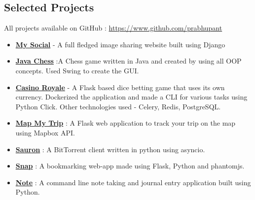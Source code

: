 \documentclass[margin, centered] {res}
\begin{document}
\begin{resume}
\section{Selected Projects}
All projects available on GitHub : \url{https://www.github.com/prabhupant}
\begin{itemize}[leftmargin=*]
 \item \textbf{\href{https://github.com/prabhupant/my-social}{My Social}} - A full fledged image sharing website built using Django
 \item \textbf{\href{https://github.com/prabhupant/OOP-Chess}{Java Chess}} :A Chess game written in Java and created by using all OOP concepts. Used Swing to create the GUI.
 \item \textbf{\href{https://github.com/prabhupant/casino-royale}{Casino Royale}} - A Flask based dice betting game that uses its own currency. Dockerized the application and made a CLI for various tasks using Python Click. Other technologies used - Celery, Redis, PostgreSQL.
 \item \textbf{\href{https://github.com/prabhupant/map-my-trip}{Map My Trip}} : A Flask web application to track your trip on the map using Mapbox API.
 \item \textbf{\href{https://github.com/prabhupant/sauronl}{Sauron}} : A BitTorrent client written in python using asyncio.
  \item \textbf{\href{https://github.com/prabhupant/snap}{Snap}} : A bookmarking web-app made using Flask, Python and phantomjs.
  \item \textbf{\href{https://github.com/prabhupant/note}{Note}} : A command line note taking and journal entry application built using Python.


\end{itemize}



\end{resume}
\end{document}
